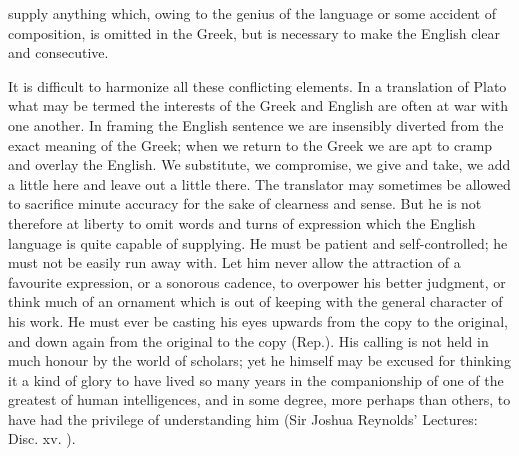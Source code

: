 \documentclass[11pt,letter]{article}
\begin{document}
supply anything which, owing to the genius of the language or some accident of composition, is omitted in the Greek, but is necessary to make the English clear and consecutive.

\par  It is difficult to harmonize all these conflicting elements. In a translation of Plato what may be termed the interests of the Greek and English are often at war with one another. In framing the English sentence we are insensibly diverted from the exact meaning of the Greek; when we return to the Greek we are apt to cramp and overlay the English. We substitute, we compromise, we give and take, we add a little here and leave out a little there. The translator may sometimes be allowed to sacrifice minute accuracy for the sake of clearness and sense. But he is not therefore at liberty to omit words and turns of expression which the English language is quite capable of supplying. He must be patient and self-controlled; he must not be easily run away with. Let him never allow the attraction of a favourite expression, or a sonorous cadence, to overpower his better judgment, or think much of an ornament which is out of keeping with the general character of his work. He must ever be casting his eyes upwards from the copy to the original, and down again from the original to the copy (Rep.). His calling is not held in much honour by the world of scholars; yet he himself may be excused for thinking it a kind of glory to have lived so many years in the companionship of one of the greatest of human intelligences, and in some degree, more perhaps than others, to have had the privilege of understanding him (Sir Joshua Reynolds' Lectures: Disc. xv. ).
\end{document}
